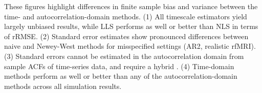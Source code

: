 \documentclass[latex/main.tex]{subfiles}
\begin{document}
These figures highlight differences in finite sample bias and variance between the time- and autocorrelation-domain methods. (1) All timescale estimators yield largely unbiased results, while LLS performs as well or better than NLS in terms of rRMSE. (2) Standard error estimates show pronounced differences between naive and Newey-West methods for misspecified settings (AR2, realistic rfMRI). (3) Standard errors cannot be estimated in the autocorrelation domain from sample ACFs of time-series data, and require a hybrid . (4) Time-domain methods perform as well or better than any of the autocorrelation-domain methods across all simulation results. 
\end{document}

